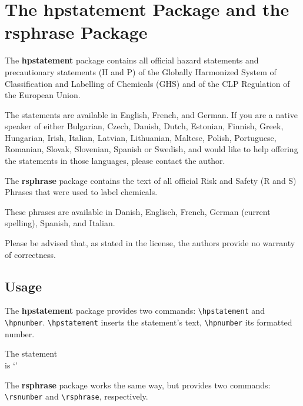 \documentclass[a4paper,notitlepage,parskip=half]{scrreprt}
\begin{document}
\chapter{The hpstatement Package and the rsphrase Package}\label{sec:rsphrase}

The \textbf{hpstatement} package contains all official
hazard statements and precautionary statements (H and P) of the
Globally Harmonized System of Classification and Labelling of Chemicals (GHS)
and of the CLP Regulation of the European Union.

The statements are available in
  English,
  French,
  and
  German.
If you are a native speaker of either
Bulgarian,
Czech,
Danish,
Dutch,
Estonian,
Finnish,
Greek,
Hungarian,
Irish,
Italian,
Latvian,
Lithuanian,
Maltese,
Polish,
Portuguese,
Romanian,
Slovak,
Slovenian,
Spanish or
Swedish,
and would like to help offering the statements in those languages, please
contact the author.

\bigskip

The \textbf{rsphrase} package contains the text of all official
Risk and Safety (R and S) Phrases that were used to label chemicals.

These phrases are
available in Danish, Englisch, French, German (current spelling), Spanish, and
Italian.

\bigskip

Please be advised that, as stated in the license, the authors provide no
warranty of correctness.


\section{Usage}

The \textbf{hpstatement} package provides two commands: \verb|\hpstatement| and
\verb|\hpnumber|. \verb|\hpstatement| inserts the statement's text,
\verb|\hpnumber| its formatted number.\bigskip

\begin{addmargin}[1em]{0em}
\begin{SideBySideExample}[xrightmargin=7cm]
  The statement \\
  is `'
\end{SideBySideExample}
\end{addmargin}
\bigskip

\noindent The \textbf{rsphrase} package works the same way, but provides two
commands: \verb|\rsnumber| and \verb|\rsphrase|, respectively.
\end{document}
